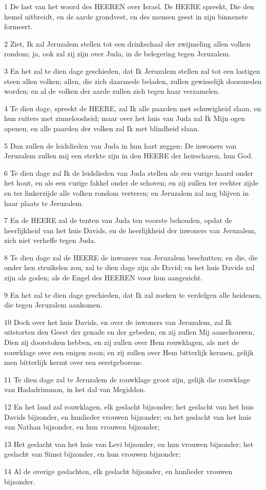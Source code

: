 \par 1 De last van het woord des HEEREN over Israel. De HEERE spreekt, Die den hemel uitbreidt, en de aarde grondvest, en des mensen geest in zijn binnenste formeert.
\par 2 Ziet, Ik zal Jeruzalem stellen tot een drinkschaal der zwijmeling allen volken rondom; ja, ook zal zij zijn over Juda, in de belegering tegen Jeruzalem.
\par 3 En het zal te dien dage geschieden, dat Ik Jeruzalem stellen zal tot een lastigen steen allen volken; allen, die zich daarmede beladen, zullen gewisselijk doorsneden worden; en al de volken der aarde zullen zich tegen haar verzamelen.
\par 4 Te dien dage, spreekt de HEERE, zal Ik alle paarden met schuwigheid slaan, en hun ruiters met zinneloosheid; maar over het huis van Juda zal Ik Mijn ogen openen, en alle paarden der volken zal Ik met blindheid slaan.
\par 5 Dan zullen de leidslieden van Juda in hun hart zeggen: De inwoners van Jeruzalem zullen mij een sterkte zijn in den HEERE der heirscharen, hun God.
\par 6 Te dien dage zal Ik de leidslieden van Juda stellen als een vurige haard onder het hout, en als een vurige fakkel onder de schoven; en zij zullen ter rechter zijde en ter linkerzijde alle volken rondom verteren; en Jeruzalem zal nog blijven in haar plaats te Jeruzalem.
\par 7 En de HEERE zal de tenten van Juda ten voorste behouden, opdat de heerlijkheid van het huis Davids, en de heerlijkheid der inwoners van Jeruzalem, zich niet verheffe tegen Juda.
\par 8 Te dien dage zal de HEERE de inwoners van Jeruzalem beschutten; en die, die onder hen struikelen zou, zal te dien dage zijn als David; en het huis Davids zal zijn als goden; als de Engel des HEEREN voor hun aangezicht.
\par 9 En het zal te dien dage geschieden, dat Ik zal zoeken te verdelgen alle heidenen, die tegen Jeruzalem aankomen.
\par 10 Doch over het huis Davids, en over de inwoners van Jeruzalem, zal Ik uitstorten den Geest der genade en der gebeden; en zij zullen Mij aanschouwen, Dien zij doorstoken hebben, en zij zullen over Hem rouwklagen, als met de rouwklage over een enigen zoon; en zij zullen over Hem bitterlijk kermen, gelijk men bitterlijk kermt over een eerstgeborene.
\par 11 Te dien dage zal te Jeruzalem de rouwklage groot zijn, gelijk die rouwklage van Hadadrimmon, in het dal van Megiddon.
\par 12 En het land zal rouwklagen, elk geslacht bijzonder; het geslacht van het huis Davids bijzonder, en hunlieder vrouwen bijzonder; en het geslacht van het huis van Nathan bijzonder, en hun vrouwen bijzonder;
\par 13 Het geslacht van het huis van Levi bijzonder, en hun vrouwen bijzonder; het geslacht van Simei bijzonder, en hun vrouwen bijzonder;
\par 14 Al de overige geslachten, elk geslacht bijzonder, en hunlieder vrouwen bijzonder.

